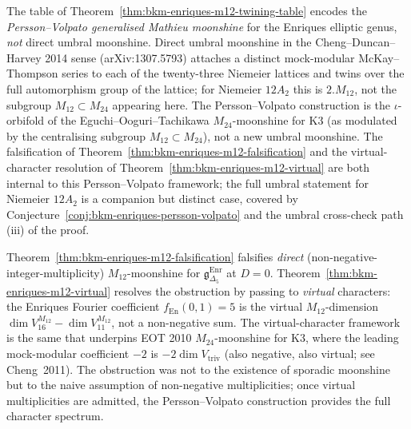 \begin{remark}
\label{rem:bkm-enriques-m12-twining-scope}
The table of
Theorem~\textup{\ref{thm:bkm-enriques-m12-twining-table}} encodes the
\emph{Persson--Volpato generalised Mathieu moonshine} for the Enriques
elliptic genus, \emph{not} direct umbral moonshine. Direct umbral
moonshine in the Cheng--Duncan--Harvey 2014 sense
(arXiv:1307.5793) attaches a distinct mock-modular
McKay--Thompson series to each of the twenty-three Niemeier lattices
and twins over the full automorphism group of the lattice; for
Niemeier $12A_2$ this is $2.M_{12}$, not the subgroup
$M_{12}\subset M_{24}$ appearing here. The Persson--Volpato
construction is the $\iota$-orbifold of the Eguchi--Ooguri--Tachikawa
$M_{24}$-moonshine for K3 (as modulated by the centralising
subgroup $M_{12}\subset M_{24}$), not a new umbral moonshine. The
falsification of Theorem~\ref{thm:bkm-enriques-m12-falsification} and
the virtual-character resolution of
Theorem~\ref{thm:bkm-enriques-m12-virtual} are both internal to this
Persson--Volpato framework; the full umbral statement for Niemeier
$12A_2$ is a companion but distinct case, covered by
Conjecture~\ref{conj:bkm-enriques-persson-volpato} and the umbral
cross-check path (iii) of the proof.
\end{remark}

\begin{remark}
\label{rem:bkm-enriques-m12-resolved}
Theorem~\textup{\ref{thm:bkm-enriques-m12-falsification}} falsifies
\emph{direct} (non-negative-integer-multiplicity) $M_{12}$-moonshine for
$\mathfrak{g}_{\Delta_5}^{\mathrm{Enr}}$ at $D = 0$.
Theorem~\textup{\ref{thm:bkm-enriques-m12-virtual}} resolves the
obstruction by passing to \emph{virtual} characters: the Enriques
Fourier coefficient $f_{\mathrm{En}}(0, 1) = 5$ is the virtual
$M_{12}$-dimension $\dim V^{M_{12}}_{16} - \dim V^{M_{12}}_{11}$, not a
non-negative sum. The virtual-character framework is the same that
underpins EOT 2010 $M_{24}$-moonshine for K3, where the leading
mock-modular coefficient $-2$ is $-2\dim V_{\mathrm{triv}}$ (also
negative, also virtual; see Cheng~2011). The obstruction was not to
the existence of sporadic moonshine but to the naive assumption of
non-negative multiplicities; once virtual multiplicities are admitted,
the Persson--Volpato construction provides the full character spectrum.
\end{remark}

